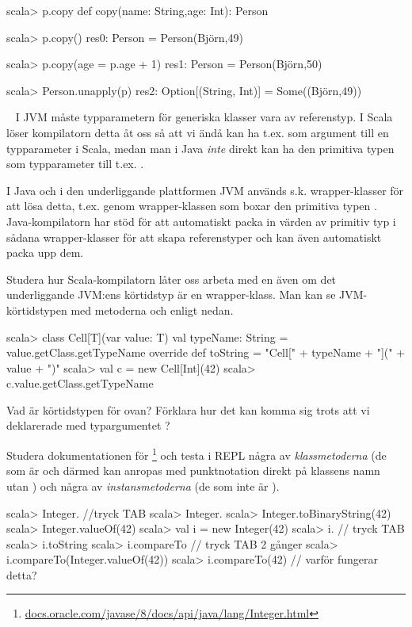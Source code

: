 \begin{REPLnonum}
scala> p.copy
   def copy(name: String,age: Int): Person

scala> p.copy()
res0: Person = Person(Björn,49)

scala> p.copy(age = p.age + 1)
res1: Person = Person(Björn,50)

scala> Person.unapply(p)
res2: Option[(String, Int)] = Some((Björn,49))
\end{REPLnonum}



\QUESTEND







\QUESTBEGIN

\Task  \what~  I JVM måste typparametern för generiska klasser vara av referenstyp. I Scala löser kompilatorn detta åt oss så att vi ändå kan ha t.ex.  som argument till en typparameter i Scala, medan man i Java \emph{inte} direkt kan ha den primitiva typen  som typparameter till t.ex. .

I Java och i den underliggande plattformen JVM används s.k. wrapper-klasser för att lösa detta, t.ex. genom wrapper-klassen  som boxar den primitiva typen . Java-kompilatorn har stöd för att automatiskt packa in värden av primitiv typ i sådana wrapper-klasser för att skapa referenstyper och kan även automatiskt packa upp dem.

\Subtask Studera hur Scala-kompilatorn låter oss arbeta med en  även om det underliggande JVM:ens körtidstyp  är en wrapper-klass. Man kan se JVM-körtidstypen med metoderna  och  enligt nedan.
\begin{REPL}
scala> class Cell[T](var value: T){
         val typeName: String = value.getClass.getTypeName
         override def toString = "Cell[" + typeName + "](" + value + ")"
       }
scala> val c = new Cell[Int](42)
scala> c.value.getClass.getTypeName
\end{REPL}


\Subtask Vad är körtidstypen för  ovan? Förklara hur det kan komma sig trots att vi deklarerade med typargumentet ?

\Subtask Studera dokumentationen för \footnote{\href{https://docs.oracle.com/javase/8/docs/api/java/lang/Integer.html}{docs.oracle.com/javase/8/docs/api/java/lang/Integer.html}} och testa i REPL några av \emph{klassmetoderna} (de som är  och därmed kan anropas med punktnotation direkt på klassens namn utan ) och några av \emph{instansmetoderna} (de som inte är ).
\begin{REPL}
scala> Integer.  //tryck TAB
scala> Integer.
scala> Integer.toBinaryString(42)
scala> Integer.valueOf(42)
scala> val i = new Integer(42)
scala> i.  // tryck TAB
scala> i.toString
scala> i.compareTo  // tryck TAB 2 gånger
scala> i.compareTo(Integer.valueOf(42))
scala> i.compareTo(42)  // varför fungerar detta?
\end{REPL}

